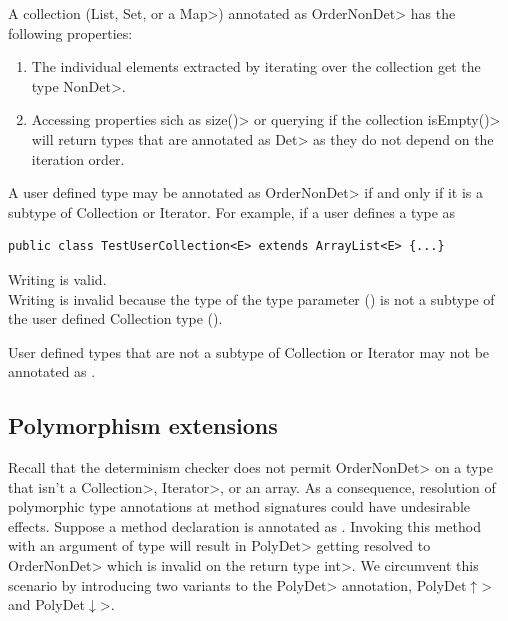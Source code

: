 A collection (\<List, Set, or a Map>) annotated as \<OrderNonDet> has the following properties:
\begin{enumerate}
    \item The individual elements extracted by iterating over the collection get the type \<NonDet>.
    \item Accessing properties sich as \<size()> or querying if the collection \<isEmpty()> will return types
    that are annotated as \<Det> as they do not depend on the iteration order. 
\end{enumerate}

A user defined type may be annotated as \<OrderNonDet> if and only if it
is a subtype of Collection or Iterator.
For example, if a user defines a type as
\begin{verbatim}
public class TestUserCollection<E> extends ArrayList<E> {...}
\end{verbatim}
Writing  is valid.\\
Writing  is invalid
because the type of the type parameter () is not a subtype
of the user defined Collection type ().

User defined types that are not a subtype of Collection or Iterator
may not be annotated as .

\subsection{Polymorphism extensions}\label{polymorphism-extensions}

Recall that the determinism checker does not permit \<OrderNonDet> on a type that isn't a \<Collection>, \<Iterator>, or an array.
As a consequence, resolution of polymorphic type annotations at method signatures could have undesirable effects.
Suppose a method declaration is annotated as . Invoking this method
with an argument of type  will result in \<PolyDet> getting resolved to \<OrderNonDet> which is invalid
on the return type \<int>. We circumvent this scenario by introducing two variants to the \<PolyDet> annotation, \<PolyDet$\uparrow$>
and \<PolyDet$\downarrow$>. 

%
%
%
%

